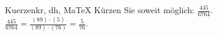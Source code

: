 \begin{MAufgabe}{Kuerzen}{kr, dh, MaTeX}
K\"urzen Sie soweit m\"oglich: $\frac{445}{6764}$.\\ 
\ifLsg\MLoesung
\quad $\frac{445}{6764}=\frac{(89)\cdot(5)}{(89)\cdot(76)}=\frac{5}{76}$.\else\relax\fi
 \end{MAufgabe}